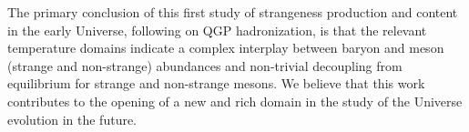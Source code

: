 The primary conclusion of this first study of strangeness production and content in the early Universe, following on QGP hadronization, is that the relevant temperature domains indicate a complex interplay between baryon and meson (strange and non-strange) abundances and non-trivial decoupling from equilibrium for strange and non-strange mesons. We believe that this work contributes to the opening of a new and rich domain in the study of the Universe evolution in the future. 




